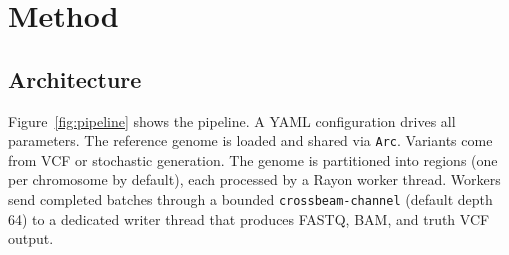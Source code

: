 \section{Method}
\label{sec:method}

\subsection{Architecture}

Figure~\ref{fig:pipeline} shows the pipeline.
A YAML configuration drives all parameters.
The reference genome is loaded and shared via \texttt{Arc}.
Variants come from VCF or stochastic generation.
The genome is partitioned into regions (one per chromosome by default), each processed by a Rayon\autocite{rayon} worker thread.
Workers send completed batches through a bounded \texttt{crossbeam-channel} (default depth 64) to a dedicated writer thread that produces FASTQ, BAM, and truth VCF output.

